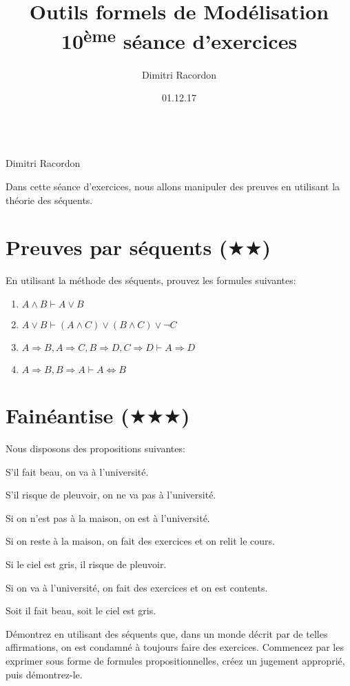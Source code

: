 \documentclass[a4paper, titlepage]{article}
\makeatletter
\numberwithin{figure}{section}
\numberwithin{table}{section}
\newcommand\objective[1]{\def\@objective{#1}}
\newcommand{\makecustomtitle}{%
	\begin{center}
		\huge\@title \\
		[1ex]\small Dimitri Racordon \\ \@date
	\end{center}
	\@objective
}
\makeatother
\begin{document}
  \title{Outils formels de Modélisation \\ 10\textsuperscript{ème} séance d'exercices}
  \author{Dimitri Racordon}
  \date{01.12.17}
	\objective{
    Dans cette séance d'exercices,
    nous allons manipuler des preuves en utilisant la théorie des séquents.
  }

	\makecustomtitle

  \section{Preuves par séquents ($\bigstar\bigstar$)}
    En utilisant la méthode des séquents, prouvez les formules suivantes:
    \begin{enumerate}
      \item $A \land B \vdash A \vee B$
      \item $A \vee B \vdash (A \land C) \vee (B \land C) \vee \neg C$
      \item $A \Rightarrow B, A \Rightarrow C, B \Rightarrow D, C \Rightarrow D \vdash A \Rightarrow D$
      \item $A \Rightarrow B, B \Rightarrow A \vdash A \Leftrightarrow B$
    \end{enumerate}

  \section{Fainéantise ($\bigstar\bigstar\bigstar$)}
    Nous disposons des propositions suivantes:
    \begin{compactitem}
      \item S'il fait beau, on va à l'université.
      \item S'il risque de pleuvoir, on ne va pas à l'université.
      \item Si on n'est pas à la maison, on est à l'université.
      \item Si on reste à la maison, on fait des exercices et on relit le cours.
      \item Si le ciel est gris, il risque de pleuvoir.
      \item Si on va à l'université, on fait des exercices et on est contents.
      \item Soit il fait beau, soit le ciel est gris.
    \end{compactitem}

    Démontrez en utilisant des séquents que, dans un monde décrit par de telles affirmations,
    on est condamné à toujours faire des exercices.
    Commencez par les exprimer sous forme de formules propositionnelles,
    créez un jugement approprié, puis démontrez-le.
\end{document}
